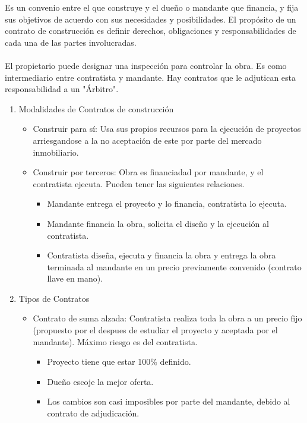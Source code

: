 \documentclass{article} %
\begin{document}
Es un convenio entre el que construye y el dueño o mandante que financia, y fija sus objetivos
de acuerdo con sus necesidades y posibilidades. El propósito de un contrato de construcción
es definir derechos, obligaciones y responsabilidades de cada una de las partes involucradas.
\\\\
El propietario puede designar una inspección para controlar la obra. Es como intermediario entre
contratista y mandante. Hay contratos que le adjutican esta responsabilidad a un "Árbitro".

\begin{enumerate}
    \item Modalidades de Contratos de construcción
    \begin{itemize}
        \item Construir para sí: Usa sus propios recursos para la ejecución de proyectos arriesgandose a la no aceptación de este por parte del mercado inmobiliario.
        \item Construir por terceros: Obra es financiadad por mandante, y el contratista ejecuta. Pueden tener las siguientes relaciones.
        \begin{itemize}
            \item Mandante entrega el proyecto y lo financia, contratista lo ejecuta.
            \item Mandante financia la obra, solicita el diseño y la ejecución al contratista.
            \item Contratista diseña, ejecuta y financia la obra y entrega la obra terminada al mandante en
            un precio previamente convenido (contrato llave en mano).
        \end{itemize}
    \end{itemize}
    \item Tipos de Contratos
    \begin{itemize}
        \item Contrato de suma alzada: Contratista realiza toda la obra a un precio fijo (propuesto por el despues de estudiar el proyecto y aceptada por el mandante). Máximo riesgo es del contratista.
        \begin{itemize}
            \item Proyecto tiene que estar 100\% definido.
            \item Dueño escoje la mejor oferta.
            \item Los cambios son casi imposibles por parte del mandante, debido al contrato de adjudicación.

\end{itemize}
\end{itemize}
\end{enumerate}
\end{document}

